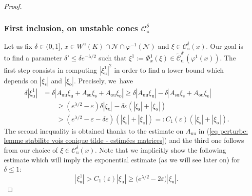 \documentclass[JEP,XML,SOM,Unicode,NoEqCountersInSection,NoFloatCountersInSection,published]{cedram}
\newcommand{\ro}{\mathrm{o}}
\newcommand{\rs}{\mathrm{s}}
\newcommand{\ru}{\mathrm{u}}
\theoremstyle{definition}
\theoremstyle{plain}
\newcommand{\Ccal}{\mathcal{C}}
\newcommand{\Ncal}{\mathcal{N}}
\begin{document}
\begin{proof}
\subsubsection*{First inclusion, on unstable cones $\Ccal_\ru^{\delta}$} Let us fix $\delta\in(0,1]$, $x \in W^\ru (K) \cap \Ncal \cap \varphi^{-1} (\Ncal)$ and $\xi \in \Ccal_\ru^{\delta} (x)$. Our goal is to find a parameter $\delta' \leq \delta e^{-\lambda/2} $ such that $\xi^1:= \Phi_x^1 (\xi) \in \widetilde {\Ccal}_\ru^{\delta'} (\varphi^1 (x))$. The first step consists in computing $|\xi_\ru^1|^2$ in order to find a lower bound which depends on $|\xi_\rs|$ and $|\xi_\ro|$. Precisely, we~have
\begin{equation}\label{eq: proof perturb vois conique tilde - lower bound unstable}
\begin{split}
\delta |\xi_\ru^1| &= \delta |A_{\ru\ru} \xi_\ru + A_{\rs\ru} \xi_\rs + A_{\ro\ru} \xi_\ro | \geq \delta |A_{\ru\ru} \xi_\ru| - \delta |A_{\rs\ru} \xi_\rs + A_{\ro\ru} \xi_\ro | \\
&\qquad \geq (e^{\lambda/2} -\varepsilon) \delta | \xi_\ru| - \delta \varepsilon (|\xi_\rs| + |\xi_\ro|) \\
& \qquad > (e^{\lambda/2} -\varepsilon - \delta \varepsilon) (|\xi_\rs| + |\xi_\ro|) =: C_1 (\varepsilon) (|\xi_\rs| + |\xi_\ro|).
\end{split}
\end{equation}
The second inequality is obtained thanks to the estimate on $A_{\ru\ru}$ in (\ref{eq perturbe: lemme stabilite vois conique tilde - estimées matrices}) and the third one follows from our choice of $\xi \in \Ccal_\ru^{\delta} (x)$. Note that we implicitly show the following estimate which will imply the exponential estimate (as we will see later on) for $\delta \leq 1$:
\begin{equation}\label{inequality intermediate exponential bound}
|\xi_\ru^1| > C_1 (\varepsilon) |\xi_\ru| \geq \bigl(e^{\lambda/2} -2\varepsilon \bigr) |\xi_\ru|.
\end{equation}


\end{proof}
\end{document}
